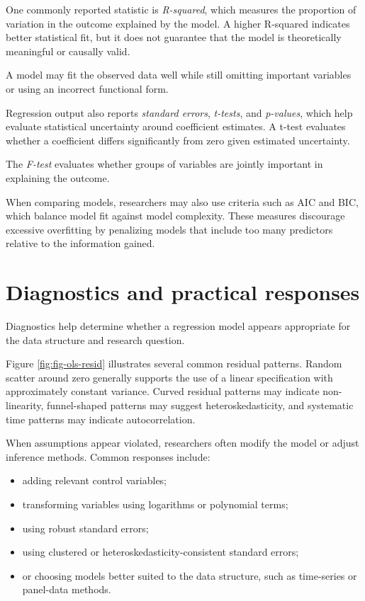 \documentclass[
  11pt,
  oneside]{book}
\providecommand{\tightlist}{%
  \setlength{\itemsep}{0pt}\setlength{\parskip}{0pt}}
\begin{document}
One commonly reported statistic is \emph{R-squared}, which measures the proportion of variation in the outcome explained by the model. A higher R-squared indicates better statistical fit, but it does not guarantee that the model is theoretically meaningful or causally valid.

A model may fit the observed data well while still omitting important variables or using an incorrect functional form.

Regression output also reports \emph{standard errors}, \emph{t-tests}, and \emph{p-values}, which help evaluate statistical uncertainty around coefficient estimates. A t-test evaluates whether a coefficient differs significantly from zero given estimated uncertainty.

The \emph{F-test} evaluates whether groups of variables are jointly important in explaining the outcome.

When comparing models, researchers may also use criteria such as AIC and BIC, which balance model fit against model complexity. These measures discourage excessive overfitting by penalizing models that include too many predictors relative to the information gained.

\section{Diagnostics and practical responses}\label{diagnostics-and-practical-responses}

Diagnostics help determine whether a regression model appears appropriate for the data structure and research question.

Figure \ref{fig:fig-ols-resid} illustrates several common residual patterns. Random scatter around zero generally supports the use of a linear specification with approximately constant variance. Curved residual patterns may indicate non-linearity, funnel-shaped patterns may suggest heteroskedasticity, and systematic time patterns may indicate autocorrelation.

When assumptions appear violated, researchers often modify the model or adjust inference methods. Common responses include:

\begin{itemize}
\tightlist
\item
  adding relevant control variables;
\item
  transforming variables using logarithms or polynomial terms;
\item
  using robust standard errors;
\item
  using clustered or heteroskedasticity-consistent standard errors;
\item
  or choosing models better suited to the data structure, such as time-series or panel-data methods.
\end{itemize}
\end{document}
